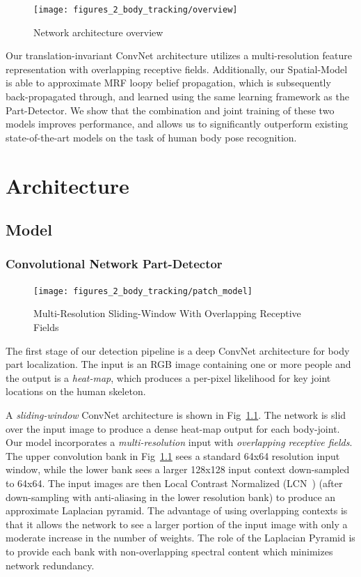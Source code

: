 \begin{figure}[th]
\centering
    \texttt{[image: figures\_2\_body\_tracking/overview]}
    \caption{Network architecture overview}
  \label{fig:overview_body_tracking}
\end{figure}

Our translation-invariant ConvNet architecture utilizes a multi-resolution feature representation with overlapping receptive fields. Additionally, our Spatial-Model is able to approximate MRF loopy belief propagation, which is subsequently back-propagated through, and learned using the same learning framework as the Part-Detector. We show that the combination and joint training of these two models improves performance, and allows us to significantly outperform existing state-of-the-art models on the task of human body pose recognition.

\chapter{Architecture\label{chap:2_body_tracking_archiecture}}

\section{Model}

\subsection{Convolutional Network Part-Detector}
\label{sec:conv_model}
\begin{figure}[th]
\centering
    \texttt{[image: figures\_2\_body\_tracking/patch\_model]}
    \caption{Multi-Resolution Sliding-Window With Overlapping Receptive Fields}
  \label{fig:multiResPatchModel}
\end{figure}

The first stage of our detection pipeline is a deep ConvNet architecture for body part localization. The input is an RGB image containing one or more people and the output is a \emph{heat-map}, which produces a per-pixel likelihood for key joint locations on the human skeleton.

A \emph{sliding-window} ConvNet architecture is shown in Fig~\ref{fig:multiResPatchModel}. The network is slid over the input image to produce a dense heat-map output for each body-joint. Our model incorporates a \emph{multi-resolution} input with \emph{overlapping receptive fields}. The upper convolution bank in Fig~\ref{fig:multiResPatchModel} sees a standard 64x64 resolution input window, while the lower bank sees a larger 128x128 input context down-sampled to 64x64. The input images are then Local Contrast Normalized (LCN~\cite{torch7}) (after down-sampling with anti-aliasing in the lower resolution bank) to produce an approximate Laplacian pyramid. The advantage of using overlapping contexts is that it allows the network to see a larger portion of the input image with only a moderate increase in the number of weights. The role of the Laplacian Pyramid is to provide each bank with non-overlapping spectral content which minimizes network redundancy.

